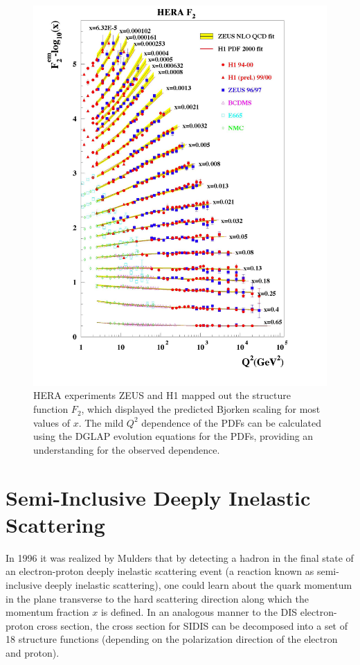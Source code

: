 \begin{figure}
	\centering
	\label{fig:f2}
	\includegraphics[width = \textwidth]{image/plots/introduction/f2.jpg}	
	\caption[$F_{2} (Q^2)$ results from HERA]{HERA experiments ZEUS and H1 mapped out the structure function $F_2$, which displayed the predicted Bjorken scaling for most values of $x$.   The mild $Q^2$ dependence of the PDFs can be calculated using the DGLAP evolution equations for the PDFs, providing an understanding for the observed dependence.}
\end{figure}

\section{Semi-Inclusive Deeply Inelastic Scattering}
In 1996 it was realized by Mulders that by detecting a hadron in the final state of an electron-proton deeply inelastic scattering event (a reaction known as semi-inclusive deeply inelastic scattering), one could learn about the quark momentum in the plane transverse to the hard scattering direction along which the momentum fraction $x$ is defined.  In an analogous manner to the DIS electron-proton cross section, the cross section for SIDIS can be decomposed into a set of 18 structure functions (depending on the polarization direction of the electron and proton). 

